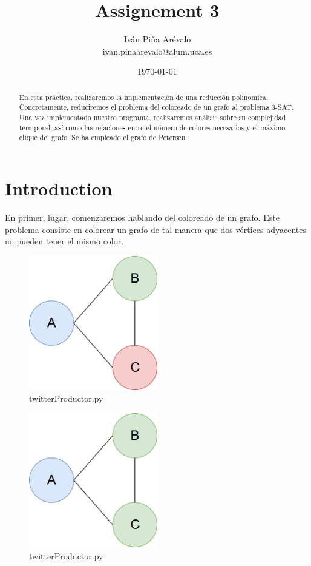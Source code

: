 \documentclass{article}
\title{Assignement 3}
\author{Iván Piña Arévalo \\ ivan.pinaarevalo@alum.uca.es}
\date{\today}
\begin{document}
\maketitle

\newpage
\begin{abstract}
    En esta práctica, realizaremos la implementación de una reducción polinomica. 
    Concretamente, reduciremos el problema del coloreado de un grafo al problema
    3-SAT. Una vez implementado nuestro programa, realizaremos análisis sobre su 
    complejidad termporal, así como las relaciones entre el número de colores 
    necesarios y el máximo clique del grafo. Se ha empleado el grafo de Petersen.
\end{abstract}

\newpage

\section{Introduction}
    En primer, lugar, comenzaremos hablando del coloreado de un grafo. Este problema
    consiste en colorear un grafo de tal manera que dos vértices adyacentes no pueden 
    tener el mismo color. 
    \begin{figure}[H]
        \centering
        \includegraphics[width=0.5\textwidth]{pictures/ejemplo.png}
        \caption{twitterProductor.py}
    \end{figure}
	
    \begin{figure}[H]
        \centering
        \includegraphics[width=0.5\textwidth]{pictures/ejemplobad.png}
        \caption{twitterProductor.py}
    \end{figure}
\end{document}
